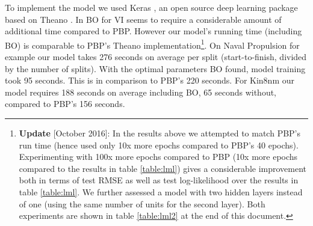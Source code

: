 \documentclass{article}
\theoremstyle{definition}
\begin{document}
To implement the model we used Keras \citep{Chollet2015}, an open source deep learning package based on Theano \citep{bergstra+al:2010-scipy}. 
In \citep{hernandez2015probabilistic} BO for VI seems to require a considerable amount of additional time compared to PBP.
However our model's running time (including BO) is comparable to PBP's Theano implementation\footnote{
\textbf{Update} [October 2016]: In the results above we attempted to match PBP's run time (hence used only 10x more epochs compared to PBP's 40 epochs). Experimenting with 100x more epochs compared to PBP (10x more epochs compared to the results in table \ref{table:lml}) gives a considerable improvement both in terms of test RMSE as well as test log-likelihood over the results in table \ref{table:lml}. We further assessed a model with two hidden layers instead of one (using the same number of units for the second layer). Both experiments are shown in table \ref{table:lml2} at the end of this document.
}. On Naval Propulsion for example our model takes 276 seconds on average per split (start-to-finish, divided by the number of splits). 
With the optimal parameters BO found, model training took 95 seconds. This is in comparison to PBP's 220 seconds. 
For Kin8nm our model requires 188 seconds on average including BO, 65 seconds without, compared to PBP's 156 seconds. 
\end{document}
